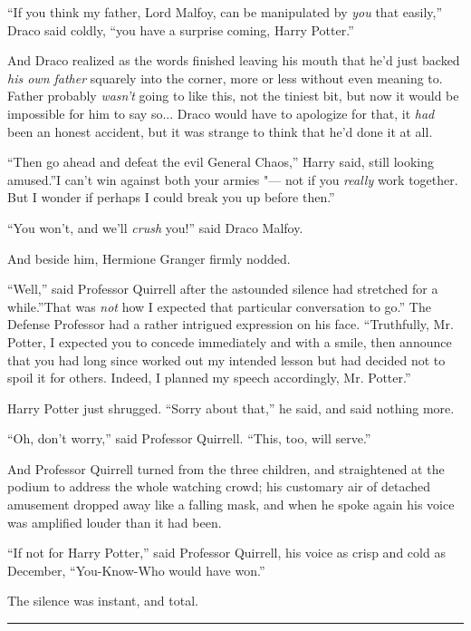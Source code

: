 ``If you think my father, Lord Malfoy, can be manipulated by \emph{you}
that easily,'' Draco said coldly, ``you have a surprise coming, Harry
Potter.''

And Draco realized as the words finished leaving his mouth that he'd
just backed \emph{his own father} squarely into the corner, more or less
without even meaning to. Father probably \emph{wasn't} going to like
this, not the tiniest bit, but now it would be impossible for him to say
so... Draco would have to apologize for that, it \emph{had} been an
honest accident, but it was strange to think that he'd done it at all.

``Then go ahead and defeat the evil General Chaos,'' Harry said, still
looking amused.''I can't win against both your armies "--- not if you
\emph{really} work together. But I wonder if perhaps I could break you
up before then.''

``You won't, and we'll \emph{crush} you!'' said Draco Malfoy.

And beside him, Hermione Granger firmly nodded.

``Well,'' said Professor Quirrell after the astounded silence had
stretched for a while.''That was \emph{not} how I expected that
particular conversation to go.'' The Defense Professor had a rather
intrigued expression on his face. ``Truthfully, Mr. Potter, I expected
you to concede immediately and with a smile, then announce that you had
long since worked out my intended lesson but had decided not to spoil it
for others. Indeed, I planned my speech accordingly, Mr. Potter.''

Harry Potter just shrugged. ``Sorry about that,'' he said, and said
nothing more.

``Oh, don't worry,'' said Professor Quirrell. ``This, too, will serve.''

And Professor Quirrell turned from the three children, and straightened
at the podium to address the whole watching crowd; his customary air of
detached amusement dropped away like a falling mask, and when he spoke
again his voice was amplified louder than it had been.

``If not for Harry Potter,'' said Professor Quirrell, his voice as crisp
and cold as December, ``You-Know-Who would have won.''

The silence was instant, and total.

\begin{center}\rule{3in}{0.4pt}\end{center}

